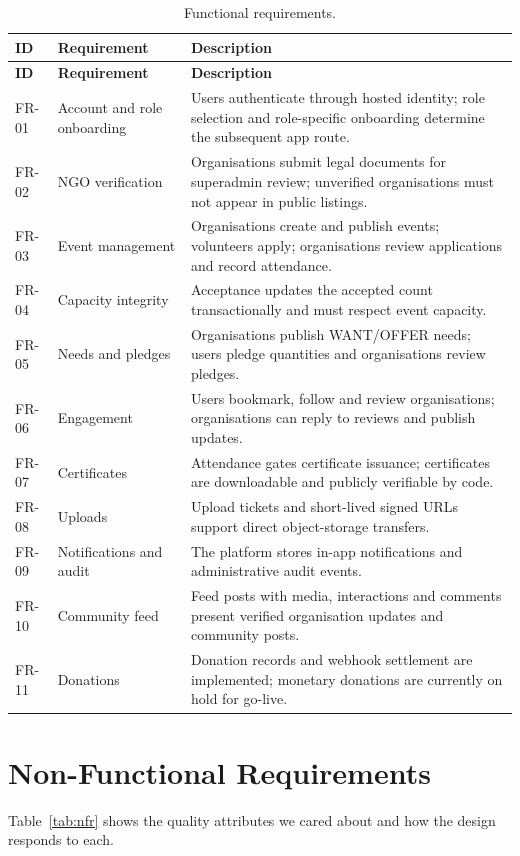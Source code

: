 \begin{longtable}{|p{}|p{}|p{}|}
\caption{Functional requirements.}\label{tab:fr}\\\hline
\textbf{ID} & \textbf{Requirement} & \textbf{Description}\\\hline
\endfirsthead
\hline
\textbf{ID} & \textbf{Requirement} & \textbf{Description}\\\hline
\endhead
FR-01 & Account and role onboarding & Users authenticate through hosted identity; role selection and role-specific onboarding determine the subsequent app route.\\\hline
FR-02 & NGO verification & Organisations submit legal documents for superadmin review; unverified organisations must not appear in public listings.\\\hline
FR-03 & Event management & Organisations create and publish events; volunteers apply; organisations review applications and record attendance.\\\hline
FR-04 & Capacity integrity & Acceptance updates the accepted count transactionally and must respect event capacity.\\\hline
FR-05 & Needs and pledges & Organisations publish WANT/OFFER needs; users pledge quantities and organisations review pledges.\\\hline
FR-06 & Engagement & Users bookmark, follow and review organisations; organisations can reply to reviews and publish updates.\\\hline
FR-07 & Certificates & Attendance gates certificate issuance; certificates are downloadable and publicly verifiable by code.\\\hline
FR-08 & Uploads & Upload tickets and short-lived signed URLs support direct object-storage transfers.\\\hline
FR-09 & Notifications and audit & The platform stores in-app notifications and administrative audit events.\\\hline
FR-10 & Community feed & Feed posts with media, interactions and comments present verified organisation updates and community posts.\\\hline
FR-11 & Donations & Donation records and webhook settlement are implemented; monetary donations are currently on hold for go-live.\\\hline
\end{longtable}

\section{Non-Functional Requirements}
Table~\ref{tab:nfr} shows the quality attributes we cared about and how the design responds to each.

